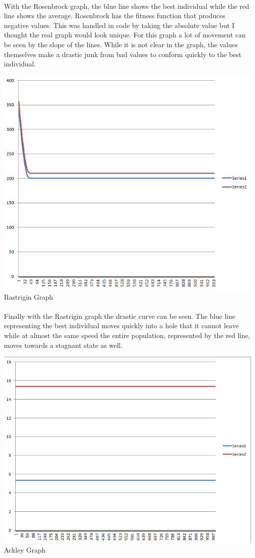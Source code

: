 \documentclass[paper=a4, fontsize=11pt]{scrartcl} %
\numberwithin{equation}{section} %
\numberwithin{figure}{section} %
\numberwithin{table}{section} %
\begin{document}
\paragraph{} With the Rosenbrock graph, the blue line shows the best individual while the red line shows the average. Rosenbrock has the fitness function that produces negative values. This was handled in code by taking the absolute value but I thought the real graph would look unique. For this graph a lot of movement can be seen by the slope of the lines. While it is not clear in the graph, the values themselves make a drastic junk from bad values to conform quickly to the best individual.

\includegraphics{Rastrigin}
Rastrigin Graph

\paragraph{} Finally with the Rastrigin graph the drastic curve can be seen. The blue line representing the best individual moves quickly into a hole that it cannot leave while at almost the same speed the entire population, represented by the red line, moves towards a stagnant state as well.

\includegraphics{Ackley}
Ackley Graph
\end{document}
